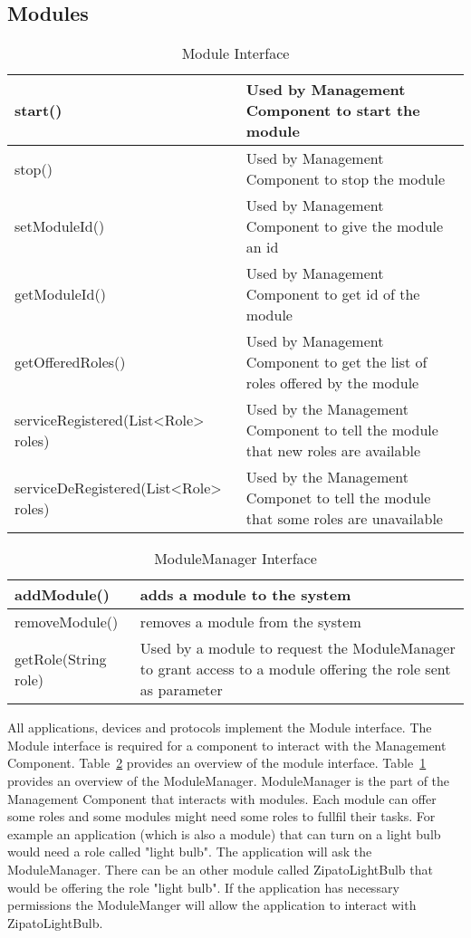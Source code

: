 \subsection{Modules}
\label{sec:modules}
\begin{table}
\begin{center}
\begin{tabular}{| l | p{5cm} |}
\hline
start() & Used by Management Component to start the module \\ \hline
stop() & Used by Management Component to stop the module \\ \hline
setModuleId() & Used by Management Component to give the module an id \\ \hline
getModuleId() & Used by Management Component to get id of the module \\ \hline
getOfferedRoles() & Used by Management Component to get the list of roles offered by the module \\ \hline
serviceRegistered(List<Role> roles) & Used by the Management Component to tell
the module that new roles are available \\ \hline
serviceDeRegistered(List<Role> roles) & Used by the Management Componet to tell
the module that some roles are unavailable \\ \hline
\end{tabular}
\end{center}
\caption{Module Interface}
\label{tab:modulemanager}
\end{table}
\begin{table}
\begin{center}
\begin{tabular}{| l | p{5cm} |}
\hline
addModule() & adds a module to the system \\ \hline
removeModule() & removes a module from the system \\ \hline
getRole(String role) & Used by a module to request the ModuleManager to grant
access to a module offering the role sent as parameter  \\ \hline
\end{tabular}
\end{center}
\caption{ModuleManager Interface}
\label{tab:module}
\end{table}
All applications, devices and protocols implement the Module interface. The
Module interface is required for a component to interact with the Management 
Component. Table~\ref{tab:module} provides an overview of the module interface.
Table~\ref{tab:modulemanager} provides an overview of the ModuleManager.
ModuleManager is the part of the Management Component that interacts with
modules. Each module can offer some roles and some modules might need some
roles to fullfil their tasks. For example an application (which is also a
module) that can turn on a light bulb would need a role called "light bulb".
The application will ask the ModuleManager. There can be an other module called
ZipatoLightBulb that would be offering the role "light bulb". If the
application has necessary permissions the ModuleManger will allow the
application to interact with ZipatoLightBulb.
